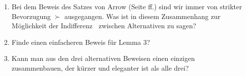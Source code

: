 \begin{enumerate}
  \item Bei dem Beweis des Satzes von Arrow (Seite \pageref{BeweisArrow}ff.)
  sind wir immer von strikter Bevorzugung $\succ$ ausgegangen. Was ist in
  diesem Zusammenhang zur Möglichkeit der Indifferenz $~$ zwischen Alternativen
  zu sagen?

  \item Finde einen einfacheren Beweis für Lemma 3?  
   
  \item Kann man aus den drei alternativen Beweisen einen einzigen
  zusammenbauen, der kürzer und eleganter ist als alle drei?
  
\end{enumerate}

